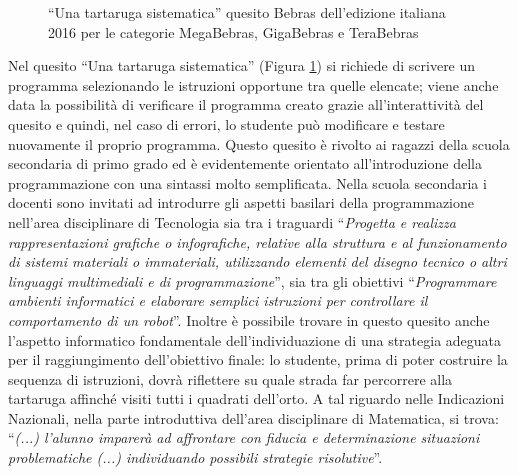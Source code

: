 \documentclass[12pt]{report}
\begin{document}
\bigskip

\begin{figure}[h]
	\centering
	\caption{``Una tartaruga sistematica'' quesito Bebras dell'edizione italiana 2016 per le categorie MegaBebras, GigaBebras e TeraBebras}\label{fig:tartaruga}
\end{figure}

Nel quesito ``Una tartaruga sistematica'' (Figura \ref{fig:tartaruga}) si richiede di scrivere un programma selezionando le istruzioni opportune tra quelle elencate; viene anche data la possibilità di verificare il programma creato grazie all'interattività del 	quesito e quindi, nel caso di errori, lo studente può modificare e testare nuovamente il proprio programma. Questo quesito è rivolto ai ragazzi della scuola secondaria di primo grado ed è evidentemente orientato all'introduzione della programmazione con una sintassi molto semplificata. Nella scuola secondaria i docenti sono invitati ad introdurre gli aspetti basilari della programmazione nell'area disciplinare di Tecnologia sia tra i traguardi ``\textit{Progetta e realizza rappresentazioni grafiche o infografiche, relative alla struttura e al funzionamento di sistemi materiali o immateriali, utilizzando elementi del disegno tecnico o altri linguaggi multimediali e di programmazione}'', sia tra gli obiettivi ``\textit{Programmare ambienti informatici e elaborare semplici istruzioni per controllare il comportamento di un robot}''.
Inoltre è possibile trovare in questo quesito anche l'aspetto informatico fondamentale dell'individuazione di una strategia adeguata per il raggiungimento dell'obiettivo finale: lo studente, prima di poter costruire la sequenza di istruzioni, dovrà riflettere su quale strada far percorrere alla tartaruga affinché visiti tutti i quadrati dell'orto. A tal riguardo nelle Indicazioni Nazionali, nella parte introduttiva dell'area disciplinare di Matematica, si trova: ``\textit{(...) l’alunno imparerà ad affrontare con fiducia e determinazione situazioni problematiche (...) individuando possibili strategie risolutive}''.
\end{document}
